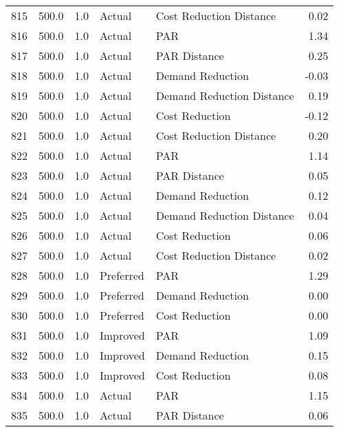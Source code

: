 \begin{longtable}{lrrllr}
815  &        500.0 &     1.0 &         Actual &    Cost Reduction Distance &   0.02 \\
816  &        500.0 &     1.0 &         Actual &                        PAR &   1.34 \\
817  &        500.0 &     1.0 &         Actual &               PAR Distance &   0.25 \\
818  &        500.0 &     1.0 &         Actual &           Demand Reduction &  -0.03 \\
819  &        500.0 &     1.0 &         Actual &  Demand Reduction Distance &   0.19 \\
820  &        500.0 &     1.0 &         Actual &             Cost Reduction &  -0.12 \\
821  &        500.0 &     1.0 &         Actual &    Cost Reduction Distance &   0.20 \\
822  &        500.0 &     1.0 &         Actual &                        PAR &   1.14 \\
823  &        500.0 &     1.0 &         Actual &               PAR Distance &   0.05 \\
824  &        500.0 &     1.0 &         Actual &           Demand Reduction &   0.12 \\
825  &        500.0 &     1.0 &         Actual &  Demand Reduction Distance &   0.04 \\
826  &        500.0 &     1.0 &         Actual &             Cost Reduction &   0.06 \\
827  &        500.0 &     1.0 &         Actual &    Cost Reduction Distance &   0.02 \\
828  &        500.0 &     1.0 &      Preferred &                        PAR &   1.29 \\
829  &        500.0 &     1.0 &      Preferred &           Demand Reduction &   0.00 \\
830  &        500.0 &     1.0 &      Preferred &             Cost Reduction &   0.00 \\
831  &        500.0 &     1.0 &       Improved &                        PAR &   1.09 \\
832  &        500.0 &     1.0 &       Improved &           Demand Reduction &   0.15 \\
833  &        500.0 &     1.0 &       Improved &             Cost Reduction &   0.08 \\
834  &        500.0 &     1.0 &         Actual &                        PAR &   1.15 \\
835  &        500.0 &     1.0 &         Actual &               PAR Distance &   0.06 \\

\end{longtable}
